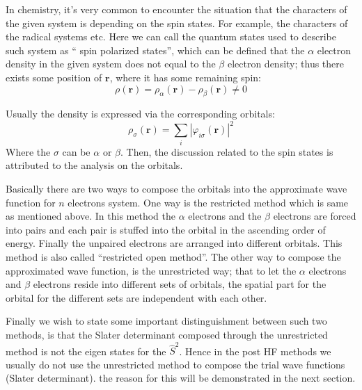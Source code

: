 In chemistry, it's very common to encounter the situation that the
characters of the given system is depending on the spin states. For
example, the characters of the radical systems etc. Here we can call
the quantum states used to describe such system as `` spin polarized
states'', which can be defined that the $\alpha$ electron density in
the given system does not equal to the $\beta$ electron density;
thus there exists some position of $\mathbf{r}$, where it has some
remaining spin:
\begin{equation}\label{}
\rho(\mathbf{r}) = \rho_{\alpha}(\mathbf{r}) -
\rho_{\beta}(\mathbf{r}) \neq 0
\end{equation}

Usually the density is expressed via the corresponding orbitals:
\begin{equation}\label{}
\rho_{\sigma}(\mathbf{r}) =
\sum_{i}|\varphi_{i\sigma}(\mathbf{r})|^{2}
\end{equation}
Where the $\sigma$ can be $\alpha$ or $\beta$. Then, the discussion
related to the spin states is attributed to the analysis on the
orbitals.

Basically there are two ways to compose the orbitals into the
approximate wave function for $n$ electrons system. One way is the
restricted method which is same as mentioned above. In this method
the $\alpha$ electrons and the $\beta$ electrons are forced into
pairs and each pair is stuffed into the orbital in the ascending
order of energy. Finally the unpaired electrons are arranged into
different orbitals. This method is also called ``restricted open
method''. The other way to compose the approximated wave function,
is the unrestricted way; that to let the $\alpha$ electrons and
$\beta$ electrons reside into different sets of orbitals, the
spatial part for the orbital for the different sets are independent
with each other.

Finally we wish to state some important distinguishment between such
two methods, is that the Slater determinant composed through the
unrestricted method is not the eigen states for the
$\hat{S}^{2}$. Hence in the post HF methods we usually do not use the
unrestricted method to compose the trial wave functions (Slater
determinant). the reason for this will be demonstrated in the next
section. 

